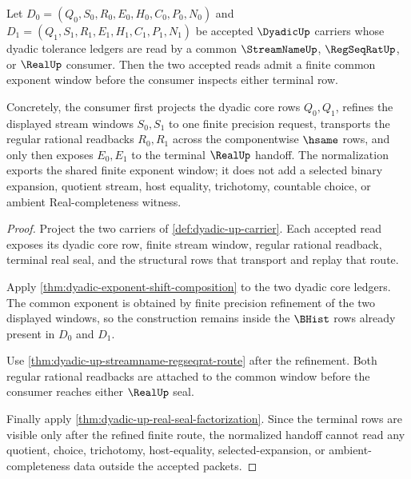 \begin{theorem}
\label{thm:dyadic-up-common-exponent-normalization}
Let $D_0=(Q_0,S_0,R_0,E_0,H_0,C_0,P_0,N_0)$ and $D_1=(Q_1,S_1,R_1,E_1,H_1,C_1,P_1,N_1)$ be accepted $\DyadicUp$ carriers whose dyadic tolerance ledgers are read by a common $\StreamNameUp$, $\RegSeqRatUp$, or $\RealUp$ consumer. Then the two accepted reads admit a finite common exponent window before the consumer inspects either terminal row.

Concretely, the consumer first projects the dyadic core rows $Q_0,Q_1$, refines the displayed stream windows $S_0,S_1$ to one finite precision request, transports the regular rational readbacks $R_0,R_1$ across the componentwise $\hsame$ rows, and only then exposes $E_0,E_1$ to the terminal $\RealUp$ handoff. The normalization exports the shared finite exponent window; it does not add a selected binary expansion, quotient stream, host equality, trichotomy, countable choice, or ambient Real-completeness witness.
\end{theorem}
\begin{proof}
Project the two carriers of \autoref{def:dyadic-up-carrier}. Each accepted read exposes its dyadic core row, finite stream window, regular rational readback, terminal real seal, and the structural rows that transport and replay that route.

Apply \autoref{thm:dyadic-exponent-shift-composition} to the two dyadic core ledgers. The common exponent is obtained by finite precision refinement of the two displayed windows, so the construction remains inside the $\BHist$ rows already present in $D_0$ and $D_1$.

Use \autoref{thm:dyadic-up-streamname-regseqrat-route} after the refinement. Both regular rational readbacks are attached to the common window before the consumer reaches either $\RealUp$ seal.

Finally apply \autoref{thm:dyadic-up-real-seal-factorization}. Since the terminal rows are visible only after the refined finite route, the normalized handoff cannot read any quotient, choice, trichotomy, host-equality, selected-expansion, or ambient-completeness data outside the accepted packets.
\end{proof}


